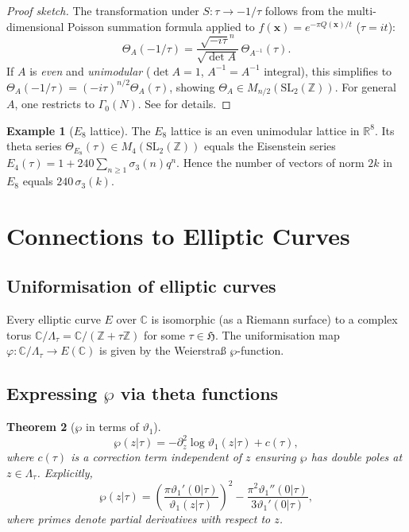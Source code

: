 \documentclass[12pt,a4paper]{amsart}
\newtheorem{theorem}{Theorem}[section]
\theoremstyle{definition}
\newtheorem{example}[theorem]{Example}
\begin{document}
\begin{proof}[Proof sketch]
The transformation under $S: \tau \to -1/\tau$ follows from the multi-dimensional
Poisson summation formula applied to $f(\mathbf{x}) = e^{-\pi Q(\mathbf{x})/t}$ ($\tau = it$):
\[
  \Theta_A(-1/\tau) = \frac{\sqrt{-i\tau}^n}{\sqrt{\det A}}\,\Theta_{A^{-1}}(\tau).
\]
If $A$ is \emph{even} and \emph{unimodular} ($\det A = 1$, $A^{-1}=A^{-1}$ integral),
this simplifies to $\Theta_A(-1/\tau) = (-i\tau)^{n/2}\Theta_A(\tau)$,
showing $\Theta_A \in M_{n/2}(\mathrm{SL}_2(\mathbb{Z}))$.
For general $A$, one restricts to $\Gamma_0(N)$. See \cite{Serre1973} for details.
\end{proof}

\begin{example}[$E_8$ lattice]
The $E_8$ lattice is an even unimodular lattice in $\mathbb{R}^8$.
Its theta series $\Theta_{E_8}(\tau) \in M_4(\mathrm{SL}_2(\mathbb{Z}))$
equals the Eisenstein series $E_4(\tau) = 1 + 240\sum_{n\geq1}\sigma_3(n)q^n$.
Hence the number of vectors of norm $2k$ in $E_8$ equals $240\,\sigma_3(k)$.
\end{example}

\section{Connections to Elliptic Curves}\label{sec:elliptic}

\subsection{Uniformisation of elliptic curves}

Every elliptic curve $E$ over $\mathbb{C}$ is isomorphic (as a Riemann surface) to
a complex torus $\mathbb{C}/\Lambda_\tau = \mathbb{C}/(\mathbb{Z} + \tau\mathbb{Z})$
for some $\tau \in \mathfrak{H}$.  The uniformisation map
$\varphi: \mathbb{C}/\Lambda_\tau \to E(\mathbb{C})$
is given by the Weierstra\ss{} $\wp$-function.

\subsection{Expressing $\wp$ via theta functions}

\begin{theorem}[$\wp$ in terms of $\vartheta_1$]\label{thm:wp_theta}
\[
  \wp(z|\tau)
  = -\partial_z^2 \log\vartheta_1(z|\tau)
    + c(\tau),
\]
where $c(\tau)$ is a correction term independent of $z$ ensuring
$\wp$ has double poles at $z \in \Lambda_\tau$.
Explicitly,
\[
  \wp(z|\tau) = \left(\frac{\pi\vartheta_1'(0|\tau)}{\vartheta_1(z|\tau)}\right)^2
  - \frac{\pi^2\vartheta_1''(0|\tau)}{3\vartheta_1'(0|\tau)},
\]
where primes denote partial derivatives with respect to $z$.
\end{theorem}
\end{document}
